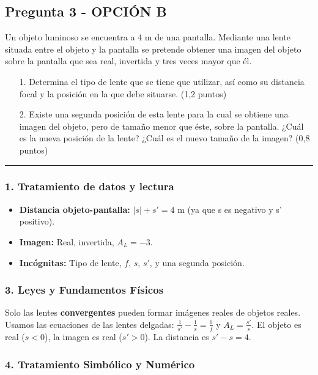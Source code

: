 \newpage

\subsection{Pregunta 3 - OPCIÓN B}
\label{subsec:3B_2004_jun_ord}

\begin{cajaenunciado}
Un objeto luminoso se encuentra a 4 m de una pantalla. Mediante una lente situada entre el objeto y la pantalla se pretende obtener una imagen del objeto sobre la pantalla que sea real, invertida y tres veces mayor que él.
\begin{enumerate}
    \item[1.] Determina el tipo de lente que se tiene que utilizar, así como su distancia focal y la posición en la que debe situarse. (1,2 puntos)
    \item[2.] Existe una segunda posición de esta lente para la cual se obtiene una imagen del objeto, pero de tamaño menor que éste, sobre la pantalla. ¿Cuál es la nueva posición de la lente? ¿Cuál es el nuevo tamaño de la imagen? (0,8 puntos)
\end{enumerate}
\end{cajaenunciado}
\hrule

\subsubsection*{1. Tratamiento de datos y lectura}
\begin{itemize}
    \item \textbf{Distancia objeto-pantalla:} $|s| + s' = 4$ m (ya que s es negativo y s' positivo).
    \item \textbf{Imagen:} Real, invertida, $A_L = -3$.
    \item \textbf{Incógnitas:} Tipo de lente, $f$, $s$, $s'$, y una segunda posición.
\end{itemize}

\subsubsection*{3. Leyes y Fundamentos Físicos}
Solo las lentes \textbf{convergentes} pueden formar imágenes reales de objetos reales.
Usamos las ecuaciones de las lentes delgadas: $\frac{1}{s'} - \frac{1}{s} = \frac{1}{f}$ y $A_L = \frac{s'}{s}$.
El objeto es real ($s<0$), la imagen es real ($s'>0$). La distancia es $s' - s = 4$.

\subsubsection*{4. Tratamiento Simbólico y Numérico}
